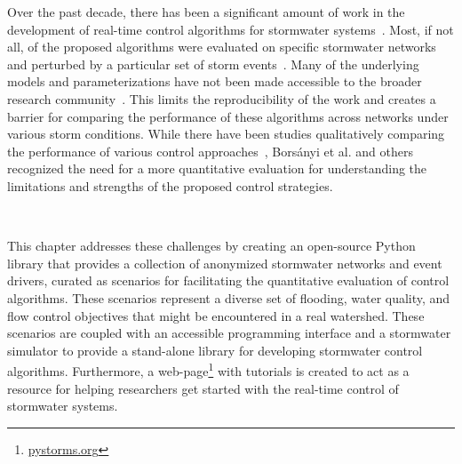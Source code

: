 Over the past decade, there has been a significant amount of work in the development of real-time control algorithms for stormwater systems~\cite{shishegar2018optimization, lund2018, Ocampo-Martinez_2015}.
Most, if not all, of the proposed algorithms were evaluated on specific stormwater networks and perturbed by a particular set of storm events~\cite{lund2018}.
Many of the underlying models and parameterizations have not been made accessible to the broader research community~\cite{lund2018, Rimer2019}.
This limits the reproducibility of the work and creates a barrier for comparing the performance of these algorithms across networks under various storm conditions.
While there have been studies qualitatively comparing the performance of various control approaches~\cite{shishegar2018optimization}, Bors\'{a}nyi et al.\cite{Borsanyi2008} and others\cite{Schutze2017} recognized the need for a more quantitative evaluation for understanding the limitations and strengths of the proposed control strategies.

\

This chapter addresses these challenges by creating an open-source Python library that provides a collection of anonymized storm\-water networks and event drivers, curated as scenarios for facilitating the quantitative evaluation of control algorithms. These scenarios represent a diverse set of flooding, water quality, and flow control objectives that might be encountered in a real watershed.
These scenarios are coupled with an accessible programming interface and a stormwater simulator to provide a stand-alone library for developing stormwater control algorithms.
Furthermore, a web-page\footnote{\href{https://www.pystorms.org}{pystorms.org}} with tutorials is created to act as a resource for helping researchers get started with the real-time control of stormwater systems.
